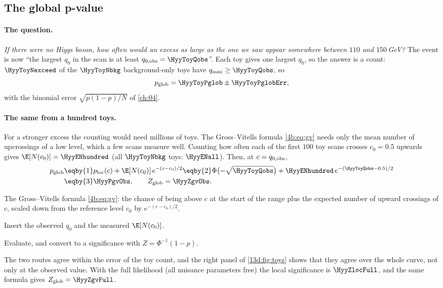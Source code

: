 \subsection{The global p-value}
\label{13d:sec:global}

\paragraph{The question.}
\emph{If there were no Higgs boson, how often would an excess as large as the one we saw
appear somewhere between $110$ and $150\,$GeV?} The event is now ``the largest $q_0$ in
the scan is at least $q_{0,\rm obs}=\HyyToyQobs$''. Each toy gives one largest $q_0$, so
the answer is a count: $\HyyToyNexceed$ of the $\HyyToyNbkg$ background-only toys have
$q_{\max}\ge\HyyToyQobs$, so
\[
  p_{\rm glob}=\HyyToyPglob\pm\HyyToyPglobErr ,
\]
with the binomial error $\sqrt{p(1-p)/N}$ of \cref{ch:04}.

\paragraph{The same from a hundred toys.}
For a stronger excess the counting would need millions of toys. The Gross--Vitells
formula \eqref{4b:eq:gv} needs only the mean number of upcrossings of a low level, which a
few scans measure well. Counting how often each of the first $100$ toy scans crosses
$c_0=0.5$ upwards gives $\E[N(c_0)]=\HyyENhundred$ (all $\HyyToyNbkg$ toys:
$\HyyENall$). Then, at $c=q_{0,\rm obs}$,
\begin{align}
  p_{\rm glob}
  &\eqby{1} p_{\rm loc}(c)+\E[N(c_0)]\,e^{-(c-c_0)/2}
   \eqby{2} \Phi\bigl(-\sqrt{\HyyToyQobs}\bigr)+\HyyENhundred\,e^{-(\HyyToyQobs-0.5)/2}
  \nonumber\\
  &\eqby{3} \HyyPgvObs ,
  \qquad Z_{\rm glob}=\HyyZgvObs .
  \label{13d:eq:gv-data}
\end{align}
\begin{explain}
  \item The Gross--Vitells formula \eqref{4b:eq:gv}: the chance of being above $c$ at the
        start of the range plus the expected number of upward crossings of $c$, scaled
        down from the reference level $c_0$ by $e^{-(c-c_0)/2}$.
  \item Insert the observed $q_0$ and the measured $\E[N(c_0)]$.
  \item Evaluate, and convert to a significance with $Z=\Phi^{-1}(1-p)$.
\end{explain}
The two routes agree within the error of the toy count, and the right panel of
\cref{13d:fig:toys} shows that they agree over the whole curve, not only at the observed
value. With the full likelihood (all nuisance parameters free) the local significance is
$\HyyZlocFull$, and the same formula gives $Z_{\rm glob}=\HyyZgvFull$.

